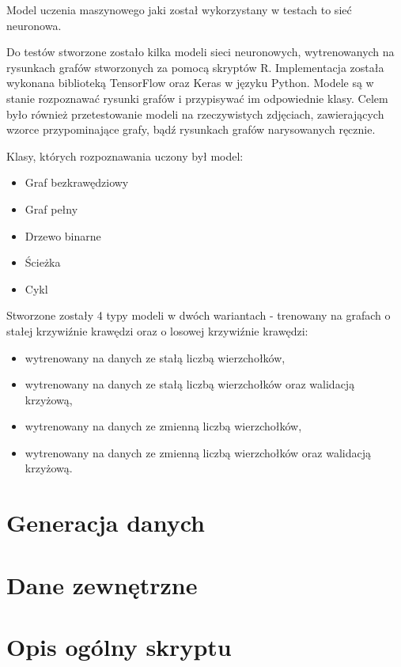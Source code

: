 Model uczenia maszynowego jaki został wykorzystany w testach to sieć neuronowa.

Do testów stworzone zostało kilka modeli sieci neuronowych,
wytrenowanych na rysunkach grafów stworzonych za pomocą skryptów R.
Implementacja została wykonana biblioteką TensorFlow oraz Keras w języku Python.
Modele są w stanie rozpoznawać rysunki grafów i przypisywać im odpowiednie klasy.
Celem było również przetestowanie modeli na rzeczywistych zdjęciach,
zawierających wzorce przypominające grafy, bądź rysunkach grafów narysowanych ręcznie.

Klasy, których rozpoznawania uczony był model:
\begin{itemize}[label=-,labelsep=0.4cm,leftmargin=0.6cm]
	\item Graf bezkrawędziowy
	\item Graf pełny
	\item Drzewo binarne
	\item Ścieżka
	\item Cykl
\end{itemize}

Stworzone zostały 4 typy modeli w dwóch wariantach - trenowany na grafach o stałej krzywiźnie krawędzi oraz o losowej krzywiźnie krawędzi:
\begin{itemize}[label=-,labelsep=0.4cm,leftmargin=0.6cm]
	\item wytrenowany na danych ze stałą liczbą wierzchołków,
	\item wytrenowany na danych ze stałą liczbą wierzchołków oraz walidacją krzyżową,
	\item wytrenowany na danych ze zmienną liczbą wierzchołków,
	\item wytrenowany na danych ze zmienną liczbą wierzchołków oraz walidacją krzyżową.
\end{itemize}

\section{Generacja danych}


\section{Dane zewnętrzne}


\section{Opis ogólny skryptu}
